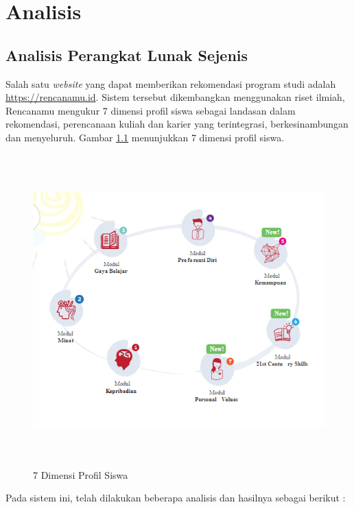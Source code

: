 \chapter{Analisis}
\label{chap:analisis}

\section{Analisis Perangkat Lunak Sejenis}
\label{sec:analisis pl}

Salah satu \textit{website} yang dapat memberikan rekomendasi program studi adalah \url{https://rencanamu.id}. Sistem tersebut dikembangkan menggunakan riset ilmiah, Rencanamu mengukur 7 dimensi profil siswa sebagai landasan dalam rekomendasi, perencanaan kuliah dan karier yang terintegrasi, berkesinambungan dan menyeluruh. Gambar \ref{gambar31} menunjukkan 7 dimensi profil siswa. %

\begin{figure}[H]
    \centering
    \includegraphics[width = 12cm, height = 12cm]{doc/DokumenSkripsi/Gambar/gambar31.PNG}
    \caption{7 Dimensi Profil Siswa}
    \label{gambar31}
\end{figure}

Pada sistem ini, telah dilakukan beberapa analisis dan hasilnya sebagai berikut :

